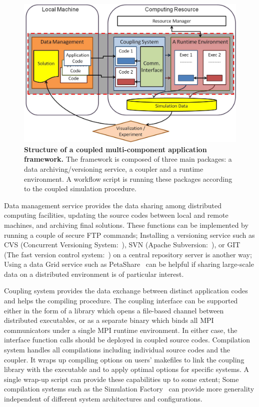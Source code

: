 \documentclass[10pt,conference]{IEEEtran}
\begin{document}
\begin{figure}[ht]
\centering
\includegraphics[width=0.8\linewidth]{Coupled_Framework_Diagram.jpg}
\vskip-0.2cm
\caption{\small {\bf Structure of a coupled multi-component application 
framework.} The framework is composed of three main packages: 
a data archiving/versioning service, a coupler and a runtime environment. 
A workflow script is running these packages according to the 
coupled simulation procedure.}
\label{Fig:Multicomponent_Framework}
\end{figure}


Data management service provides the data sharing among distributed computing
facilities, updating the source codes between local and remote machines, and
archiving final solutions. These functions can be implemented by running 
a couple of secure FTP commands;
Installing a versioning service such as 
CVS (Concurrent Versioning System:~\cite{CVS}), 
SVN (Apache Subversion:~\cite{SVN}), or 
GIT (The fast version control system:~\cite{GIT})
on a central repository server is another way; Using a data Grid service
such as PetaShare~\cite{PetaShare} can be helpful if sharing large-scale
data on a distributed environment is of particular interest.

Coupling system provides the data exchange between distinct application codes
and helps the compiling procedure. The coupling interface can be supported
either in the form of a library which opens a file-based channel between
distributed executables, or as a separate binary which binds all MPI
communicators under a single MPI runtime environment. In either case,
the interface function calls should be deployed in coupled source codes.
Compilation system handles all compilations including individual source
codes and the coupler. It wraps up compiling options on users' makefiles
to link the coupling library with the executable and 
to apply optimal options for specific systems. A single wrap-up script
can provide these capabilities up to some extent; Some compilation systems
such as the Simulation Factory~\cite{SimFactory} can provide more generality
independent of different system architectures and configurations.
\end{document}
